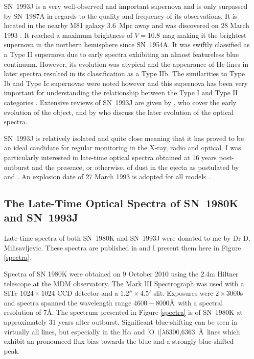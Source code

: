 SN~1993J is a very well-observed and important supernova and is only surpassed  by SN~1987A in regards to the quality and frequency of its observations.  It is located in the nearby M81 galaxy 3.6~Mpc away \citep{Freedman1994} and was discovered on 28 March 1993 \citep{Ripero1993}.  It reached a maximum brightness of $V=10.8$ mag making it the brightest supernova in the northern hemisphere since SN~1954A. It was swiftly classified as a Type II supernova due to early spectra exhibiting an almost featureless blue continuum.  However, its evolution was atypical and the appearance of He lines in later spectra resulted in its classification as a Type IIb.  The similarities to Type Ib and Type Ic supernovae were noted however and this supernova has been very important for understanding the relationship between the Type I and Type II categories \citep{Fillipenko1993,Garnavich1993}.  Extensive reviews of SN~1993J are given by \citet{Wheeler1996}, who cover the early evolution of the object, and by \citet{Matheson2000a,Matheson2000b} who discuss the later evolution of the optical spectra.  

SN~1993J is relatively isolated and quite close meaning that it has proved to be an ideal candidate for regular monitoring in the X-ray, radio and optical.  I was particularly interested in late-time optical spectra obtained at 16 years post-outburst and the presence, or otherwise, of dust in the ejecta as postulated by \citet{Fransson2005} and \citep{Milisavljevic2012}.  An explosion date of 27 March 1993 is adopted for all models \citep{Baron1993}.

\subsection{The Late-Time Optical Spectra of SN~1980K and SN~1993J}

Late-time spectra of both SN~1980K and SN~1993J were donated to me by Dr D. Milisavljevic.  These spectra are published in \citet{Milisavljevic2012} and I present them here in Figure \ref{spectra}.

Spectra of SN 1980K were obtained on 9 October 2010 using the  2.4m Hiltner telescope at the MDM observatory. The Mark III Spectrograph was used with a SITe $1024 \times 1024$ CCD detector and a $1.2'' \times 4.5'$ slit. Exposures were $2 \times 3000$s and spectra spanned the wavelength range $4600-8000$\AA\ with a spectral resolution of 7\AA. The spectrum presented in Figure \ref{spectra} is of SN~1980K at approximately 31 years after outburst. Significant blue-shifting can be seen in virtually all lines, but especially in the H$\alpha$ and [O~{\sc i}]$\lambda$6300,6363~\AA\ lines which exhibit an pronounced flux bias towards the blue and a strongly blue-shifted peak.

